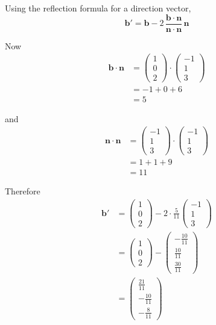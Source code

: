 \documentclass[leqno]{article}
\begin{document}
\begin{enumerate}[
  label=\textbf{\arabic*.},
  leftmargin=*,
  topsep=0pt,
  partopsep=0pt,
  parsep=0pt
]
\begin{tcolorbox}[colback=white, colframe=scarlet, title={\textbf{Solution}}, breakable, grow to left by=6mm, grow to right by=10mm]
\begin{enumerate}[label=\textbf{(\alph*)}]
Using the reflection formula for a direction vector,
\[
\mathbf b'
=\mathbf b-2\,\frac{\mathbf b\cdot\mathbf n}{\mathbf n\cdot\mathbf n}\,\mathbf n
\]

Now
\begin{align*}
\mathbf b\cdot\mathbf n
&=
\begin{pmatrix}1\\0\\2\end{pmatrix}\cdot
\begin{pmatrix}-1\\1\\3\end{pmatrix}\\
&=-1+0+6\\
&=5
\end{align*}

and
\begin{align*}
\mathbf n\cdot\mathbf n
&=
\begin{pmatrix}-1\\1\\3\end{pmatrix}\cdot
\begin{pmatrix}-1\\1\\3\end{pmatrix}\\
&=1+1+9\\
&=11
\end{align*}

Therefore
\begin{align*}
\mathbf b'
&=
\begin{pmatrix}1\\0\\2\end{pmatrix}
-2\cdot \frac{5}{11}
\begin{pmatrix}-1\\1\\3\end{pmatrix}\\
&=
\begin{pmatrix}1\\0\\2\end{pmatrix}
-\begin{pmatrix}-\frac{10}{11}\\[2pt]\frac{10}{11}\\[2pt]\frac{30}{11}\end{pmatrix}\\
&=
\begin{pmatrix}
\frac{21}{11}\\[2pt]
-\frac{10}{11}\\[2pt]
-\frac{8}{11}
\end{pmatrix}
\end{align*}


\end{enumerate}
\end{tcolorbox}
\end{enumerate}
\end{document}
